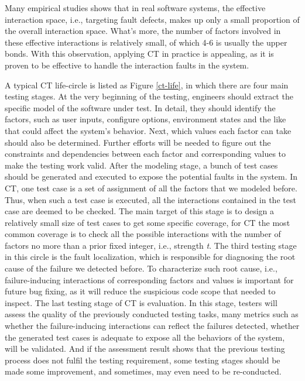 \documentclass{sig-alternate}
\begin{document}
Many empirical studies shows that in real software systems, the effective interaction space, i.e., targeting fault defects, makes up only a small proportion of the overall interaction space. What's more, the number of factors involved in these effective interactions is relatively small, of which 4-6 is usually the upper bonds. With this observation, applying CT in practice is appealing, as it is proven to be effective to handle the interaction faults in the system.

A typical CT life-circle is listed as Figure \ref{ct-life}, in which there are four main testing stages. At the very beginning of the testing, engineers should extract the specific model of the software under test. In detail, they should identify the factors, such as user inputs, configure options, environment states and the like that could affect the system's behavior. Next, which values each factor can take should also be determined. Further efforts will be needed to figure out the constraints and dependencies between each factor and corresponding values to make the testing work valid. After the modeling stage, a bunch of test cases should be generated and executed to expose the potential faults in the system. In CT, one test case is a set of assignment of all the factors that we modeled before. Thus, when such a test case is executed, all the interactions contained in the test case are deemed to be checked. The main target of this stage is to design a relatively small size of test cases to get some specific coverage, for CT the most common coverage is to check all the possible interactions with the number of factors no more than a prior fixed integer, i.e., strength \emph{t}. The third testing stage in this circle is the fault localization, which is responsible for diagnosing the root cause of the failure we detected before. To characterize such root cause, i.e., failure-inducing interactions of corresponding factors and values is important for future bug fixing, as it will reduce the suspicious code scope that needed to inspect. The last testing stage of CT is evaluation. In this stage, testers will assess the quality of the previously conducted testing tasks, many metrics such as whether the failure-inducing interactions can reflect the failures detected, whether the generated test cases is adequate to expose all the behaviors of the system,  will be validated. And if the assessment result shows that the previous testing process does not fulfil the testing requirement, some testing stages should be made some improvement, and sometimes, may even need to be re-conducted.
\end{document}
